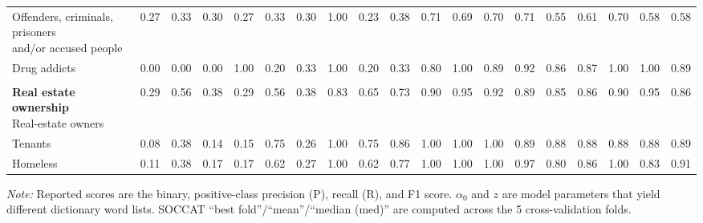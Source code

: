 \begin{table}[htb]
\begin{threeparttable}
\begin{tabular}{l ccc ccc ccc ccc ccc ccc}
\shortstack[l]{Offenders, criminals, prisoners\\[-3pt]and/or accused people} & 0.27 & 0.33 & 0.30 & 0.27 & 0.33 & 0.30 & 1.00 & 0.23 & 0.38 & 0.71 & 0.69 & 0.70 & 0.71 & 0.55 & 0.61 & 0.70 & 0.58 & 0.58 \\
Drug addicts & 0.00 & 0.00 & 0.00 & 1.00 & 0.20 & 0.33 & 1.00 & 0.20 & 0.33 & 0.80 & 1.00 & 0.89 & 0.92 & 0.86 & 0.87 & 1.00 & 1.00 & 0.89 \\
\rule{0pt}{5pt} &  &  &  &  &  &  &  &  &  &  &  &  &  &  &  &  &  &  \\
\shortstack[l]{\textbf{Real estate ownership}\\[3pt]Real-estate owners} & 0.29 & 0.56 & 0.38 & 0.29 & 0.56 & 0.38 & 0.83 & 0.65 & 0.73 & 0.90 & 0.95 & 0.92 & 0.89 & 0.85 & 0.86 & 0.90 & 0.95 & 0.86 \\
Tenants & 0.08 & 0.38 & 0.14 & 0.15 & 0.75 & 0.26 & 1.00 & 0.75 & 0.86 & 1.00 & 1.00 & 1.00 & 0.89 & 0.88 & 0.88 & 0.88 & 0.88 & 0.89 \\
Homeless & 0.11 & 0.38 & 0.17 & 0.17 & 0.62 & 0.27 & 1.00 & 0.62 & 0.77 & 1.00 & 1.00 & 1.00 & 0.97 & 0.80 & 0.86 & 1.00 & 0.83 & 0.91 \\
\bottomrule
\end{tabular}
\begin{tablenotes}[flushleft]
\footnotesize
\item \textit{Note:} Reported scores are the binary, positive-class precision (P), recall (R), and F1 score. $\alpha_0$ and $z$ are model parameters that yield different dictionary word lists. SOCCAT ``best fold''/``mean''/``median (med)'' are computed across the 5 cross-validation folds.
\end{tablenotes}
\end{threeparttable}
\end{table}